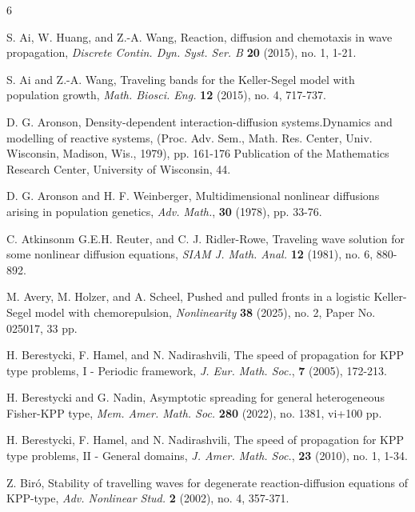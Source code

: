 \documentclass[11pt]{article} %
\theoremstyle{remark}
\theoremstyle{remark}
\numberwithin{equation}{section}
\numberwithin{figure}{section}
\numberwithin{table}{section}
\begin{document}
\begin{thebibliography}{6}




 S. Ai, W. Huang, and Z.-A.  Wang,  Reaction, diffusion and chemotaxis in wave propagation,
 {\it Discrete Contin. Dyn. Syst. Ser. B} {\bf  20} (2015), no. 1, 1-21.


  S. Ai and Z.-A.  Wang,
 Traveling bands for the Keller-Segel model with population growth,
 {\it  Math. Biosci. Eng.} {\bf 12} (2015), no. 4, 717-737.



 D. G. 
Aronson, 
Density-dependent interaction-diffusion systems.Dynamics and modelling of reactive systems,  (Proc. Adv. Sem., Math. Res. Center, Univ. Wisconsin, Madison, Wis., 1979), pp. 161-176
Publication of the Mathematics Research Center, University of Wisconsin, 44.



 { D. G. Aronson and H. F. Weinberger}, {  Multidimensional nonlinear diffusions arising in population genetics},  {\it Adv. Math.}, {\bf 30} (1978), pp. 33-76.


 C. Atkinsonm G.E.H.  Reuter, and C. J. Ridler-Rowe, 
Traveling wave solution for some nonlinear diffusion equations, {\it 
SIAM J. Math. Anal.} {\bf  12}  (1981), no. 6, 880-892.

 M. 
Avery, M.  Holzer, and A.  Scheel, 
Pushed and pulled fronts in a logistic Keller-Segel model with chemorepulsion, 
{\it Nonlinearity} {\bf 38} (2025), no. 2, Paper No. 025017, 33 pp.

   
   H. Berestycki, F. Hamel, and N. Nadirashvili, The
speed of propagation for KPP type problems, I - Periodic framework, {\it J. Eur. Math. Soc.}, {\bf 7} (2005),
172-213.



 H. Berestycki and G. Nadin, Asymptotic spreading for general heterogeneous Fisher-KPP type, 
{\it Mem. Amer. Math. Soc.} {\bf  280} (2022), no. 1381, vi+100 pp.



 H. Berestycki, F. Hamel, and N. Nadirashvili, The
speed of propagation for KPP type problems, II - General domains,  {\it J. Amer. Math. Soc.}, {\bf  23}  (2010),  no. 1,  1-34.
  


 Z. Bir\'o, 
Stability of travelling waves for degenerate reaction-diffusion equations of KPP-type, {\it 
Adv. Nonlinear Stud.} {\bf 2} (2002), no. 4, 357-371.


\end{thebibliography}
\end{document}
